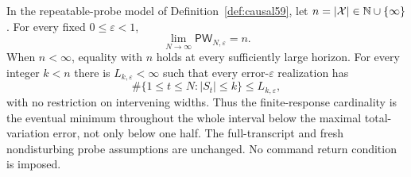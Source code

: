\begin{theorem}\label{thm:causalstrong62}
In the repeatable-probe model of Definition~\ref{def:causal59}, let
$n=|\mathcal X|\in\mathbb N\cup\{\infty\}$. For every fixed
$0\le\varepsilon<1$,
\begin{equation}\label{eq:causalstrong62}
                 \lim_{N\to\infty}\mathsf{PW}_{N,\varepsilon}=n.
\end{equation}
When $n<\infty$, equality with $n$ holds at every sufficiently large
horizon. For every integer $k<n$ there is $L_{k,\varepsilon}<\infty$
such that every error-$\varepsilon$ realization has
\begin{equation}\label{eq:causalstrongoccupation62}
          \#\{1\le t\le N:|S_t|\le k\}\le L_{k,\varepsilon},
\end{equation}
with no restriction on intervening widths. Thus the finite-response
cardinality is the eventual minimum throughout the whole interval
below the maximal total-variation error, not only below one half.
The full-transcript and fresh nondisturbing probe assumptions are
unchanged. No command return condition is imposed.
\end{theorem}

